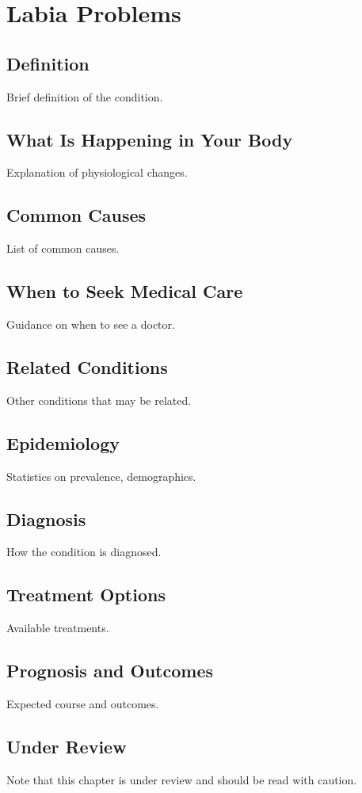\chapter{Labia Problems}
\section*{Definition}
Brief definition of the condition.

\section*{What Is Happening in Your Body}
Explanation of physiological changes.

\section*{Common Causes}
List of common causes.

\section*{When to Seek Medical Care}
Guidance on when to see a doctor.

\section*{Related Conditions}
Other conditions that may be related.

\section*{Epidemiology}
Statistics on prevalence, demographics.

\section*{Diagnosis}
How the condition is diagnosed.

\section*{Treatment Options}
Available treatments.

\section*{Prognosis and Outcomes}
Expected course and outcomes.

\section*{Under Review}
Note that this chapter is under review and should be read with caution.
